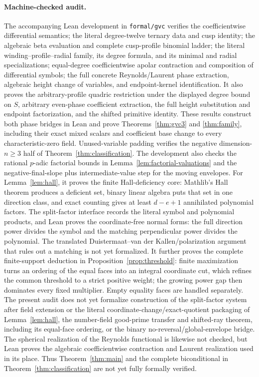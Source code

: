\documentclass[11pt]{article}
\begin{document}
\paragraph{Machine-checked audit.}
The accompanying Lean development in \texttt{formal/gvc} verifies the
coefficientwise differential semantics; the literal degree-twelve ternary
data and cusp identity; the algebraic beta evaluation and complete
cusp-profile binomial ladder; the literal winding--profile--radial family,
its degree formula, and its minimal and radial specializations;
equal-degree coefficientwise apolar
contraction and composition of differential symbols; the full concrete
Reynolds/Laurent phase extraction, algebraic height change of variables, and
endpoint-kernel identification.  It also proves the arbitrary-profile
quadric restriction under the displayed degree bound on $S$, arbitrary
even-phase coefficient extraction, the full height substitution and
endpoint factorization, and the shifted primitive identity.  These results
construct both phase bridges in Lean and prove
Theorems~\ref{thm:gvc3} and \ref{thm:family}, including their exact mixed
scalars and coefficient base change to every characteristic-zero field.
Unused-variable padding verifies the negative dimension-$n\ge3$ half of
Theorem~\ref{thm:classification}.  The development also checks the rational
$p$-adic factorial bounds in
Lemma~\ref{lem:factorial-valuations} and the negative-final-slope plus
intermediate-value step for the moving envelopes.  For
Lemma~\ref{lem:hall}, it proves the finite Hall-deficiency core: Mathlib's
Hall theorem produces a deficient set, binary linear algebra puts that set
in one direction class, and exact counting gives at least $d-e+1$
annihilated polynomial factors.  The split-factor interface records the
literal symbol and polynomial products, and Lean proves the coordinate-free
normal forms: the full direction power divides the symbol and the matching
perpendicular power divides the polynomial.  The translated
Duistermaat--van der Kallen/polarization argument that rules out a matching
is not yet formalized.  It further proves the
complete finite-support deduction in Proposition~\ref{prop:threshold}:
finite maximization turns an ordering of the equal faces into an integral
coordinate cut, which refines the common threshold to a strict positive
weight; the growing power gap then dominates every fixed multiplier.  Empty
equality faces are handled separately.
The present audit does not yet formalize construction of the split-factor
system after field extension or the literal coordinate-change/exact-quotient
packaging of Lemma~\ref{lem:hall}, the number-field
good-prime transfer and shifted-ray theorem, including its equal-face
ordering, or the binary no-reversal/global-envelope bridge.  The spherical realization of the
Reynolds functional is likewise not checked, but Lean proves the algebraic
coefficientwise contraction and Laurent realization used in its place.
Thus Theorem~\ref{thm:main} and the complete biconditional in
Theorem~\ref{thm:classification} are not yet fully formally verified.



\end{document}
